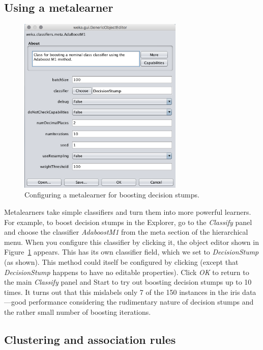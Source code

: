 \subsection{Using a metalearner}

\begin{figure}[!ht]
\centering
\includegraphics[width=0.7\textwidth]{images/B2_14.png}
\caption{Configuring a metalearner for boosting decision stumps.}
\label{fig:config_metalearner}
\end{figure}


Metalearners take simple classifiers and turn them into more powerful
learners. For example, to boost decision stumps in the Explorer, go to
the \textit{Classify} panel and choose the classifier
\textit{AdaboostM1} from the meta section of the hierarchical
menu. When you configure this classifier by clicking it, the object
editor shown in Figure~\ref{fig:config_metalearner} appears. This has
its own classifier field, which we set to \textit{DecisionStump} (as
shown). This method could itself be configured by clicking (except
that \textit{DecisionStump} happens to have no editable
properties). Click \textit{OK} to return to the main \textit{Classify}
panel and Start to try out boosting decision stumps up to 10 times. It
turns out that this mislabels only 7 of the 150 instances in the iris
data---good performance considering the rudimentary nature of decision
stumps and the rather small number of boosting iterations.

\subsection{Clustering and association rules}

